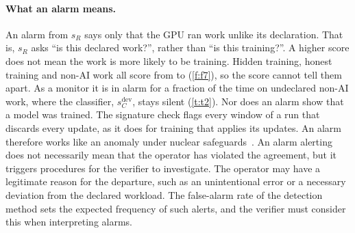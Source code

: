 \paragraph{What an alarm means.} An alarm from $s_R$ says only that the GPU ran work
unlike its declaration. That is, $s_R$ asks ``is this declared work?'', rather than ``is this
training?''. A higher score does not mean the work is more likely to be training. Hidden
training, honest training and non-AI work all score from \HidBandLo{} to \HidBandHi{}
(\cref{f:f7}), so the score cannot tell them apart. As a monitor it is in alarm for a fraction
\ARoneBusy{} of the time on undeclared non-AI work, where the classifier, $s_C^{\mathrm{dev}}$, stays silent
(\cref{t:t2}). Nor does an alarm show that a model was trained.
The signature check flags every window of a run that discards every update, as it does
for training that applies its updates. An alarm therefore works like an anomaly under
nuclear safeguards~\citep[\S\S 11.24--11.26]{iaea2022glossary}. An alarm alerting does not necessarily mean that the operator has violated the agreement, but it triggers procedures for the verifier to investigate. The operator may have a legitimate reason for the departure, such as an unintentional error or a necessary deviation from the declared workload. The false-alarm rate of the detection method sets the expected frequency of such alerts, and the verifier must consider this when interpreting alarms. 
